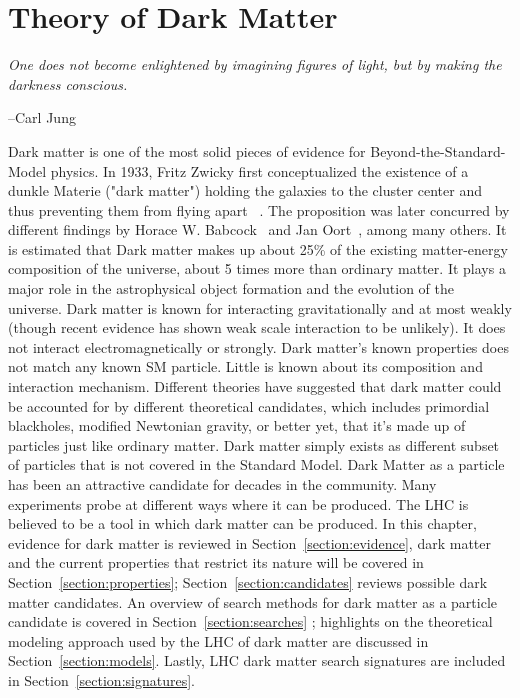 \chapter{Theory of Dark Matter}
\label{chapter:DM}


\epigraph{\textit{One does not become enlightened by imagining figures of light, but by making the darkness conscious.}}{--Carl Jung}

    Dark matter is one of the most solid pieces of evidence for Beyond-the-Standard-Model physics. In 1933, Fritz Zwicky first conceptualized the existence of a dunkle Materie ("dark matter") holding the galaxies to the cluster center and thus preventing them from flying apart ~\cite{Zwicky}. The proposition was later concurred by different findings by Horace W. Babcock~\cite{Babcock} and Jan Oort~\cite{oort}, among many others. 
    It is estimated that Dark matter makes up about 25\% of the existing matter-energy composition of the universe, about 5 times more than ordinary matter. It plays a major role in the astrophysical object formation and the evolution of the universe. 
    Dark matter is known for interacting gravitationally and at most weakly (though recent evidence has shown weak scale interaction to be unlikely). It does not interact electromagnetically or strongly. Dark matter's known properties does not match any known SM particle. Little is known about its composition and interaction mechanism. 
    Different theories have suggested that dark matter could be accounted for by different theoretical candidates, which includes primordial blackholes, modified Newtonian gravity, or better yet, that it's made up of particles just like ordinary matter. Dark matter simply exists as different subset of particles that is not covered in the Standard Model. 
    Dark Matter as a particle has been an attractive candidate for decades in the community. Many experiments probe at different ways where it can be produced. The LHC is believed to be a tool in which dark matter can be produced. 
    In this chapter, evidence for dark matter is reviewed in Section~\ref{section:evidence}, dark matter and the current properties that restrict its nature will be covered in Section~\ref{section:properties}; Section~\ref{section:candidates} reviews possible dark matter candidates. An overview of search methods for dark matter as a particle candidate is covered in Section~\ref{section:searches} ; highlights on the theoretical modeling approach used by the LHC of dark matter are discussed in Section~\ref{section:models}. Lastly, LHC dark matter search signatures are included in Section~\ref{section:signatures}.

